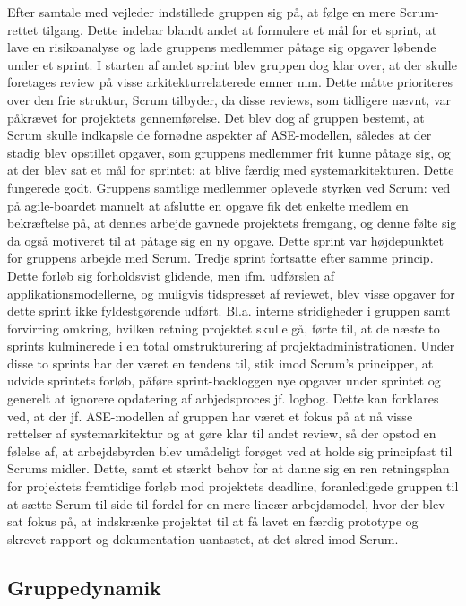 Efter samtale med vejleder indstillede gruppen sig på, at følge en mere Scrum-rettet tilgang. Dette indebar blandt andet at formulere et mål for et sprint, at lave en risikoanalyse og lade gruppens medlemmer påtage sig opgaver løbende under et sprint. I starten af andet sprint blev gruppen dog klar over, at der skulle foretages review på visse arkitekturrelaterede emner mm. Dette måtte prioriteres over den frie struktur, Scrum tilbyder, da disse reviews, som tidligere nævnt, var påkrævet for projektets gennemførelse. Det blev dog af gruppen bestemt, at Scrum skulle indkapsle de fornødne aspekter af ASE-modellen, således at der stadig blev opstillet opgaver, som gruppens medlemmer frit kunne påtage sig, og at der blev sat et mål for sprintet: at blive færdig med systemarkitekturen. Dette fungerede godt. Gruppens samtlige medlemmer oplevede styrken ved Scrum: ved på agile-boardet manuelt at afslutte en opgave fik det enkelte medlem en bekræftelse på, at dennes arbejde gavnede projektets fremgang, og denne følte sig da også motiveret til at påtage sig en ny opgave. Dette sprint var højdepunktet for gruppens arbejde med Scrum. Tredje sprint fortsatte efter samme princip. Dette forløb sig forholdsvist glidende, men ifm. udførslen af applikationsmodellerne, og muligvis tidspresset af reviewet, blev visse opgaver for dette sprint ikke fyldestgørende udført. Bl.a. interne stridigheder i gruppen samt forvirring omkring, hvilken retning projektet skulle gå, førte til, at de næste to sprints kulminerede i en total omstrukturering af projektadministrationen. Under disse to sprints
har der været en tendens til, stik imod Scrum's principper, at udvide sprintets forløb, påføre sprint-backloggen nye opgaver under sprintet og generelt at ignorere opdatering af arbjedsproces jf. logbog. Dette kan forklares ved, at der jf. ASE-modellen af gruppen har været et fokus på at nå visse rettelser af systemarkitektur og at gøre klar til andet review, så der opstod en følelse af, at arbejdsbyrden blev umådeligt forøget ved at holde sig principfast til Scrums midler. Dette, samt
et stærkt behov for at danne sig en ren retningsplan for projektets fremtidige forløb mod projektets deadline, foranledigede gruppen til at sætte Scrum til side til fordel for en mere lineær arbejdsmodel, hvor der blev sat fokus på, at indskrænke projektet til at få lavet en færdig prototype og skrevet rapport og dokumentation uantastet, at det skred imod Scrum.


\subsection{Gruppedynamik}
